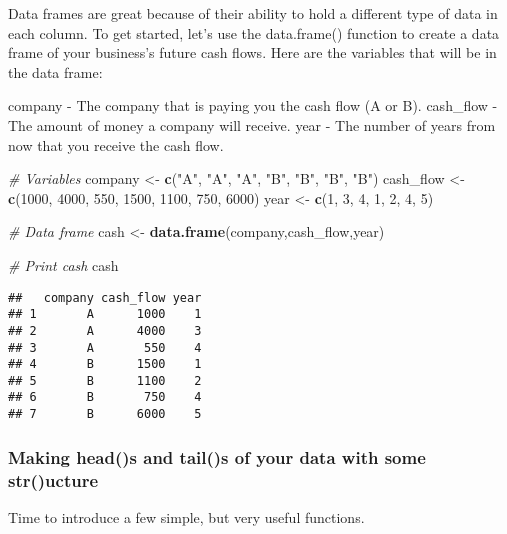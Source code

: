 \documentclass[]{article}
\newenvironment{Shaded}{\begin{snugshade}}{\end{snugshade}}
\newcommand{\KeywordTok}[1]{\textcolor[rgb]{0.13,0.29,0.53}{\textbf{#1}}}
\newcommand{\DecValTok}[1]{\textcolor[rgb]{0.00,0.00,0.81}{#1}}
\newcommand{\StringTok}[1]{\textcolor[rgb]{0.31,0.60,0.02}{#1}}
\newcommand{\CommentTok}[1]{\textcolor[rgb]{0.56,0.35,0.01}{\textit{#1}}}
\newcommand{\NormalTok}[1]{#1}
\begin{document}
Data frames are great because of their ability to hold a different type
of data in each column. To get started, let's use the data.frame()
function to create a data frame of your business's future cash flows.
Here are the variables that will be in the data frame:

company - The company that is paying you the cash flow (A or B).
cash\_flow - The amount of money a company will receive. year - The
number of years from now that you receive the cash flow.

\begin{Shaded}
\begin{Highlighting}[]
\CommentTok{# Variables}
\NormalTok{company <-}\StringTok{ }\KeywordTok{c}\NormalTok{(}\StringTok{"A"}\NormalTok{, }\StringTok{"A"}\NormalTok{, }\StringTok{"A"}\NormalTok{, }\StringTok{"B"}\NormalTok{, }\StringTok{"B"}\NormalTok{, }\StringTok{"B"}\NormalTok{, }\StringTok{"B"}\NormalTok{)}
\NormalTok{cash_flow <-}\StringTok{ }\KeywordTok{c}\NormalTok{(}\DecValTok{1000}\NormalTok{, }\DecValTok{4000}\NormalTok{, }\DecValTok{550}\NormalTok{, }\DecValTok{1500}\NormalTok{, }\DecValTok{1100}\NormalTok{, }\DecValTok{750}\NormalTok{, }\DecValTok{6000}\NormalTok{)}
\NormalTok{year <-}\StringTok{ }\KeywordTok{c}\NormalTok{(}\DecValTok{1}\NormalTok{, }\DecValTok{3}\NormalTok{, }\DecValTok{4}\NormalTok{, }\DecValTok{1}\NormalTok{, }\DecValTok{2}\NormalTok{, }\DecValTok{4}\NormalTok{, }\DecValTok{5}\NormalTok{)}

\CommentTok{# Data frame}
\NormalTok{cash <-}\StringTok{ }\KeywordTok{data.frame}\NormalTok{(company,cash_flow,year)}

\CommentTok{# Print cash}
\NormalTok{cash}
\end{Highlighting}
\end{Shaded}

\begin{verbatim}
##   company cash_flow year
## 1       A      1000    1
## 2       A      4000    3
## 3       A       550    4
## 4       B      1500    1
## 5       B      1100    2
## 6       B       750    4
## 7       B      6000    5
\end{verbatim}

\subsubsection{Making head()s and tail()s of your data with some
str()ucture}\label{making-heads-and-tails-of-your-data-with-some-structure}

Time to introduce a few simple, but very useful functions.
\end{document}
